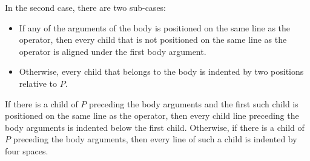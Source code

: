 In the second case, there are two sub-cases:

\begin{itemize}
\item If any of the arguments of the body is positioned on the same
  line as the operator, then every child that is not positioned on the
  same line as the operator is aligned under the first body argument.
\item Otherwise, every child that belongs to the body is indented by
  two positions relative to $P$.
\end{itemize}

If there is a child of $P$ preceding the body arguments and the first
such child is positioned on the same line as the operator, then every
child line preceding the body arguments is indented below the first
child.  Otherwise, if there is a child of $P$ preceding the body
arguments, then every line of such a child is indented by four spaces.
